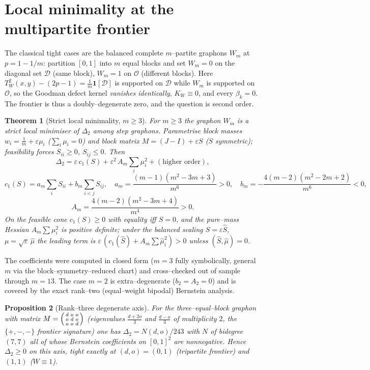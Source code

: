 \documentclass[11pt]{article}
\newtheorem{theorem}{Theorem}[section]
\newtheorem{proposition}[theorem]{Proposition}
\theoremstyle{definition}
\newcommand{\one}{\mathbf 1}
\newcommand{\tw}{T_W}
\newcommand{\kw}{K_W}
\newcommand{\Wm}{W_m}
\newcommand{\Ldiag}{\mathcal D}
\newcommand{\Loff}{\mathcal O}
\begin{document}
\section{Local minimality at the multipartite frontier}\label{sec:localmin}

The classical tight cases are the balanced complete $m$--partite graphons $\Wm$
at $p=1-1/m$: partition $[0,1]$ into $m$ equal blocks and set $\Wm=0$ on the
diagonal set $\Ldiag$ (same block), $\Wm=1$ on $\Loff$ (different blocks).  Here
$\tw^2(x,y)-(2p-1)=\tfrac1m\one[\Ldiag]$ is supported on $\Ldiag$ while $\Wm$ is
supported on $\Loff$, so the Goodman defect kernel \emph{vanishes identically},
$\kw\equiv0$, and every $\beta_k=0$.  The frontier is thus a doubly--degenerate
zero, and the question is second order.

\begin{theorem}[Strict local minimality, $m\ge3$]\label{thm:localmin}
For $m\ge3$ the graphon $\Wm$ is a strict local minimiser of $\Delta_2$ among
step graphons.  Parametrise block masses $w_i=\tfrac1m+\varepsilon\mu_i$
($\sum_i\mu_i=0$) and block matrix $M=(J-I)+\varepsilon S$ ($S$ symmetric);
feasibility forces $S_{ii}\ge0$, $S_{ij}\le0$.  Then
\[
  \Delta_2=\varepsilon\,c_1(S)+\varepsilon^2\,A_m\!\sum_i\mu_i^2+(\text{higher order}),
\]
\[
  c_1(S)=a_m\sum_i S_{ii}+b_m\!\sum_{i<j}S_{ij},\quad
  a_m=\frac{(m-1)(m^2-3m+3)}{m^6}>0,\quad
  b_m=-\frac{4(m-2)(m^2-2m+2)}{m^6}<0,
\]
\[
  A_m=\frac{4(m-2)(m^2-3m+4)}{m^4}>0 .
\]
On the feasible cone $c_1(S)\ge0$ with equality iff $S=0$, and the pure--mass
Hessian $A_m\sum\mu_i^2$ is positive definite; under the balanced scaling
$S=\varepsilon\hat S$, $\mu=\sqrt\varepsilon\,\hat\mu$ the leading term is
$\varepsilon\,(c_1(\hat S)+A_m\sum\hat\mu_i^2)>0$ unless $(\hat S,\hat\mu)=0$.
\end{theorem}

The coefficients were computed in closed form ($m=3$ fully symbolically, general
$m$ via the block--symmetry--reduced chart) and cross--checked out of sample
through $m=13$.  The case $m=2$ is extra--degenerate ($b_2=A_2=0$) and is covered
by the exact rank--two (equal--weight bipodal) Bernstein analysis.

\begin{proposition}[Rank--three degenerate axis]\label{prop:rank3}
For the three--equal--block graphon with matrix
$M=\begin{psmallmatrix}d&o&o\\o&d&o\\o&o&d\end{psmallmatrix}$ (eigenvalues
$\tfrac{d+2o}{3}$ and $\tfrac{d-o}{3}$ of multiplicity $2$, the $\{+,-,-\}$
frontier signature) one has $\Delta_2=N(d,o)/243$ with $N$ of bidegree $(7,7)$
all of whose Bernstein coefficients on $[0,1]^2$ are nonnegative.  Hence
$\Delta_2\ge0$ on this axis, tight exactly at $(d,o)=(0,1)$ (tripartite frontier)
and $(1,1)$ ($W\equiv1$).
\end{proposition}
\end{document}
